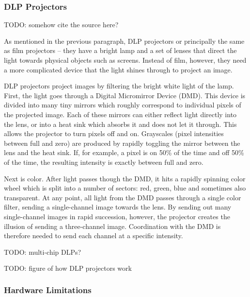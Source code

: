 \subsubsection{DLP Projectors}
\label{section:background-projection_mapping-projectors-DLP}

{\color{red} TODO: somehow cite the source here?}

As mentioned in the previous paragraph, DLP projectors or principally the same as film projectors -- they have a bright lamp and a set of lenses that direct the light towards physical objects such as screens. Instead of film, however, they need a more complicated device that the light shines through to project an image.

DLP projectors project images by filtering the bright white light of the lamp. First, the light goes through a Digital Micromirror Device (DMD). This device is divided into many tiny mirrors which roughly correspond to individual pixels of the projected image. Each of these mirrors can either reflect light directly into the lens, or into a heat sink which absorbs it and does not let it through. This allows the projector to turn pixels off and on. Grayscales (pixel intensities between full and zero) are produced by rapidly toggling the mirror between the lens and the heat sink. If, for example, a pixel is on 50\% of the time and off 50\% of the time, the resulting intensity is exactly between full and zero.

Next is color. After light passes though the DMD, it hits a rapidly spinning color wheel which is split into a number of sectors: red, green, blue and sometimes also transparent. At any point, all light from the DMD passes through a single color filter, sending a single-channel image towards the lens. By sending out many single-channel images in rapid succession, however, the projector creates the illusion of sending a three-channel image. Coordination with the DMD is therefore needed to send each channel at a specific intensity.

{\color{red} TODO: multi-chip DLPs?}

{\color{red} TODO: figure of how DLP projectors work}

\subsubsection{Hardware Limitations}
\label{section:background-projection_mapping-projectors-limitations}

